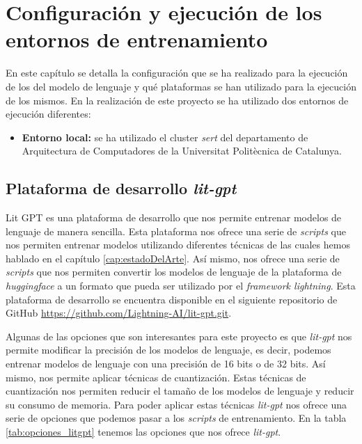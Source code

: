 \chapter{Configuración y ejecución de los entornos de entrenamiento}
\label{cap:configuracion_ejecucion}


En este capítulo se detalla la configuración que se ha realizado para la ejecución de los
del modelo de lenguaje y qué plataformas se han utilizado para la ejecución de los mismos.
En la realización de este proyecto se ha utilizado dos entornos de ejecución diferentes:

\begin{itemize}
    \item \textbf{Entorno local:} se ha utilizado el cluster \textit{sert} del departamento
        de Arquitectura de Computadores de la Universitat Politècnica de Catalunya.
\end{itemize}

\section{Plataforma de desarrollo \textit{lit-gpt}}
\label{sec:lit_gpt}


Lit GPT es una plataforma de desarrollo que nos permite entrenar modelos de
lenguaje de manera sencilla. Esta plataforma nos ofrece una serie de \textit{scripts} que nos
permiten entrenar modelos utilizando diferentes técnicas de las cuales hemos hablado
en el capítulo \ref{cap:estadoDelArte}. Así mismo, nos ofrece una serie de \textit{scripts} que nos permiten convertir
los modelos de lenguaje de la plataforma de \textit{huggingface} a un formato que pueda
ser utilizado por el \textit{framework lightning}. Esta plataforma de desarrollo se encuentra
disponible en el siguiente repositorio de GitHub \url{https://github.com/Lightning-AI/lit-gpt.git}.

Algunas de las opciones que son interesantes para este proyecto es que \textit{lit-gpt} nos
permite modificar la precisión de los modelos de lenguaje, es decir, podemos entrenar
modelos de lenguaje con una precisión de 16 bits o de 32 bits. Así mismo, nos permite
aplicar técnicas de cuantización. Estas técnicas de cuantización nos permiten reducir
el tamaño de los modelos de lenguaje y reducir su consumo de memoria.
Para poder aplicar estas técnicas \textit{lit-gpt} nos ofrece una serie de opciones que
podemos pasar a los \textit{scripts} de entrenamiento. En la tabla \ref{tab:opciones_litgpt} 
tenemos las opciones que nos ofrece \textit{lit-gpt}.


